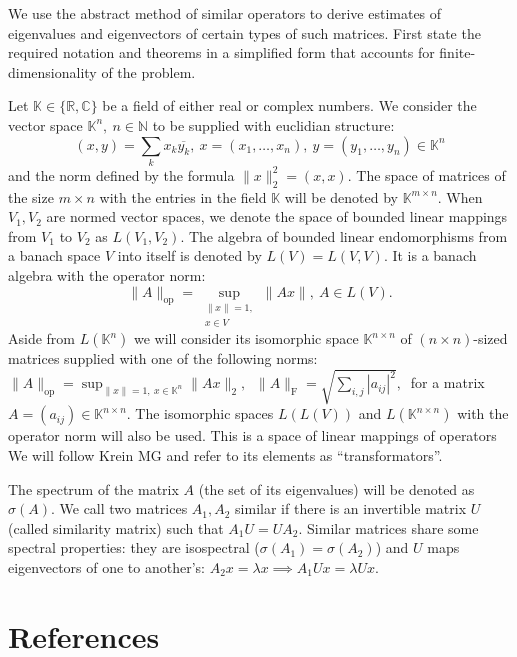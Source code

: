\documentclass[a4paper]{jpconf}
\begin{document}
We use the abstract method of similar operators
    to derive estimates of eigenvalues and eigenvectors
    of certain types of such matrices.
First state the required notation and theorems
    in a simplified form that accounts for finite-dimensionality
    of the problem.

Let \( \mathbb{K}\in \{ \mathbb{R}, \mathbb{C} \} \)
    be a field of either real or complex numbers.
We consider the vector space \( \mathbb{K}^n,\ n\in \mathbb{N} \)
    to be supplied with euclidian structure:
    \[
        (x, y){=}\sum_k x_k\overline{y_k},
        \ x{=}(x_1,\ldots, x_n),
        \ y=(y_1,\ldots, y_n)
        \in \mathbb{K}^n
        \]
    and the norm defined by the formula
    \(
        \|x\|_2^2{=}(x,x).
        \)
The space of matrices of the size \( m{\times}n \)
    with the entries in the field \( \mathbb{K} \)
    will be denoted by \( \mathbb{K}^{m{\times}n} \).
When \( V_1, V_2 \) are normed vector spaces,
    we denote the space of bounded linear mappings
    from \( V_1 \) to \( V_2 \)
    as \( L(V_1, V_2) \).
The algebra of bounded linear endomorphisms
    from a banach space \( V \)
    into itself
    is denoted by \( L(V) = L(V, V) \).
It is a banach algebra with the operator norm:
    \[
        \|A\|_{\mathrm{op}} =
        \sup_{\substack{\|x\|=1,\\ x\in V}} \|A x\|,\ A\in L(V).
        \]
Aside from \( L(\mathbb{K}^n) \)
    we will consider its isomorphic
    space \( \mathbb{K}^{n{\times}n} \)
    of \( (n{\times}n) \)-sized matrices
    supplied with one of the following norms:
    \( \|A\|_{\mathrm{op}} = \sup_{\|x\|=1,\ x\in \mathbb{K}^n} \|A x\|_2,\ \)
    \( \|A\|_{\mathrm{F}} = \sqrt{\sum_{i,j} |a_{ij}|^2},\ \)
    for a matrix 
    \( A{=}(a_{ij})\in\mathbb{K}^{n\times n} \).
The isomorphic spaces \( L(L(V)) \) and \( L(\mathbb{K}^{n{\times}n}) \)
    with the operator norm will also be used.
This is a space
    of linear mappings of operators
We will follow {Krein MG}
    and refer to its elements
    as ``transformators''.

The spectrum of the matrix \( A \)
    (the set of its eigenvalues)
    will be denoted as \( \sigma(A) \).
We call two matrices \( A_1, A_2 \) similar
    if there is an invertible matrix \( U \)
    (called similarity matrix)
    such that \( A_1 U = U A_2 \).
Similar matrices share some spectral properties:
    they are isospectral (\( \sigma(A_1) = \sigma(A_2) \))
    and \( U \) maps eigenvectors of one to another's:
    \( A_2 x = \lambda x \implies A_1 U x = \lambda U x \).
\section*{References}

{}
\end{document}
